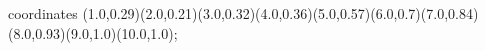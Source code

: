 					coordinates { (1.0,0.29)(2.0,0.21)(3.0,0.32)(4.0,0.36)(5.0,0.57)(6.0,0.7)(7.0,0.84)(8.0,0.93)(9.0,1.0)(10.0,1.0)};